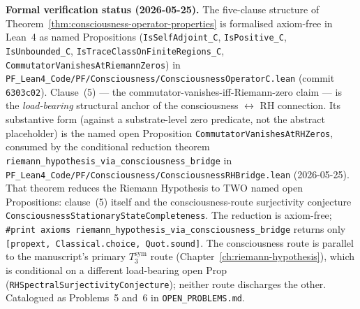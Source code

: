 \medskip\noindent\textbf{Formal verification status (2026-05-25).} The five-clause structure of Theorem~\ref{thm:consciousness-operator-properties} is formalised axiom-free in Lean~4 as named Propositions (\texttt{IsSelfAdjoint\_C}, \texttt{IsPositive\_C}, \texttt{IsUnbounded\_C}, \texttt{IsTraceClassOnFiniteRegions\_C}, \texttt{CommutatorVanishesAtRiemannZeros}) in \texttt{PF\_Lean4\_Code/PF/Consciousness/ConsciousnessOperatorC.lean} (commit \texttt{6303c02}). Clause~(5) --- the commutator-vanishes-iff-Riemann-zero claim --- is the \emph{load-bearing} structural anchor of the consciousness $\leftrightarrow$ RH connection. Its substantive form (against a substrate-level zero predicate, not the abstract placeholder) is the named open Proposition \texttt{CommutatorVanishesAtRHZeros}, consumed by the conditional reduction theorem \texttt{riemann\_hypothesis\_via\_consciousness\_bridge} in \texttt{PF\_Lean4\_Code/PF/Consciousness/ConsciousnessRHBridge.lean} (2026-05-25). That theorem reduces the Riemann Hypothesis to TWO named open Propositions: clause~(5) itself and the consciousness-route surjectivity conjecture \texttt{ConsciousnessStationaryStateCompleteness}. The reduction is axiom-free; \texttt{\#print axioms riemann\_hypothesis\_via\_consciousness\_bridge} returns only \texttt{[propext, Classical.choice, Quot.sound]}. The consciousness route is parallel to the manuscript's primary $T_3^{\mathrm{sym}}$ route (Chapter~\ref{ch:riemann-hypothesis}), which is conditional on a different load-bearing open Prop (\texttt{RHSpectralSurjectivityConjecture}); neither route discharges the other. Catalogued as Problems~5 and~6 in \texttt{OPEN\_PROBLEMS.md}.

